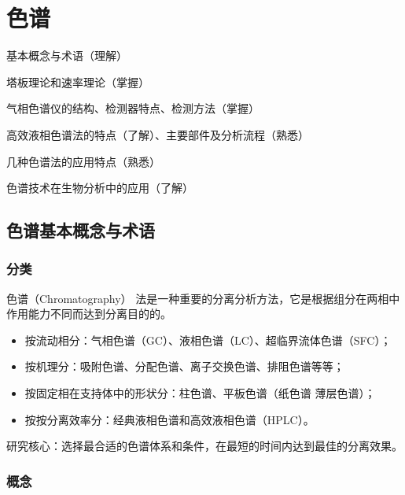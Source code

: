 \chapter{色谱}

\begin{introduction}
	\item 基本概念与术语（理解）
	\item 塔板理论和速率理论（掌握）
	\item 气相色谱仪的结构、检测器特点、检测方法（掌握）
	\item 高效液相色谱法的特点（了解）、主要部件及分析流程（熟悉）
	\item 几种色谱法的应用特点（熟悉）
	\item 色谱技术在生物分析中的应用（了解）
\end{introduction}





\section{色谱基本概念与术语}

\subsection{分类}
色谱（Chromatography） 法是一种重要的分离分析方法，它是根据组分在两相中作用能力不同而达到分离目的的。
\begin{itemize}
	\item 按流动相分：气相色谱（GC）、液相色谱（LC）、超临界流体色谱（SFC）；
	\item 按机理分：吸附色谱、分配色谱、离子交换色谱、排阻色谱等等；
	\item 按固定相在支持体中的形状分：柱色谱、平板色谱（纸色谱 薄层色谱）；
	\item 按按分离效率分：经典液相色谱和高效液相色谱（HPLC）。
\end{itemize}

研究核心：选择最合适的色谱体系和条件，在最短的时间内达到最佳的分离效果。

\subsection{概念}

